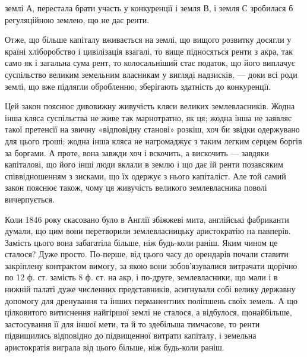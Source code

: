 \parcont{}  %
землі А, перестала брати участь у конкуренції і земля В, і земля С зробилася б
регуляційною землею, що не дає ренти.

Отже, що більше капіталу вживається на землі, що вищого розвитку досягли
у країні хліборобство і цивілізація взагалі, то вище підносяться ренти
з акра, так само як і загальна сума рент, то колосальніший стає податок, що
його виплачує суспільство великим земельним власникам у вигляді надзисків, — доки
всі роди землі, що вже підлягли обробленню, зберігають здатність до конкуренції.

Цей закон пояснює дивовижну живучість кляси великих землевласників.
Жодна інша кляса суспільства не живе так марнотратно, як ця; жодна інша
не заявляє такої претенсії на звичну «відповідну станові» розкіш, хоч би звідки
одержувано для цього гроші; жодна інша кляса не нагромаджує з таким легким
серцем боргів за боргами. А проте, вона завжди хоч і вскочить, а вискочить —
завдяки капіталові, що його інші люди вклали в землю і що дає їй ренти позавсяким
співвідношенням з зисками, що їх одержує з нього капіталіст. Але той самий закон
пояснює також, чому ця живучість великого землевласника поволі вичерпується.

Коли 1846 року скасовано було в Англії збіжжеві мита, англійські фабриканти
думали, що цим вони перетворили землевласницьку аристократію на
павперів. Замість цього вона забагатіла більше, ніж будь-коли раніш. Яким
чином це сталося? Дуже просто. По-перше, від цього часу до орендарів почали
ставити закріплену контрактом вимогу, за якою вони зобов’язувалися витрачати
щорічно по 12 ф. ст. замість 8 ф. ст. на акр, і по-друге, землевласники, що мали і в
нижній палаті дуже численних представників, асигнували собі велику державну
допомогу для дренування та інших перманентних поліпшень своїх земель. А що
цілковитого витиснення найгіршої землі не сталося, а відбулося, щонайбільше,
застосування її для іншої мети, та й то здебільша тимчасове, то ренти підвищились
відповідно до підвищенної витрати капіталу, і земельна аристократія
виграла від цього більше, ніж будь-коли раніш.

